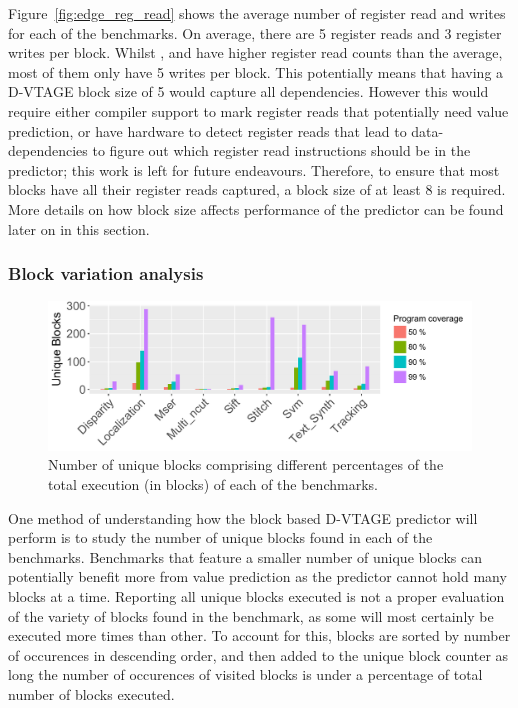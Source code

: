 Figure~\ref{fig:edge_reg_read} shows the average number of register read and writes for each of the benchmarks.
On average, there are 5 register reads and 3 register writes per block.
Whilst  ,  and  have higher register read counts than the average, most of them only have 5 writes per block.
This potentially means that having a D-VTAGE block size of 5 would capture all dependencies.
However this would require either compiler support to mark register reads that potentially need value prediction, or have hardware to detect register reads that lead to data-dependencies to figure out which register read instructions should be in the predictor; this work is left for future endeavours.
Therefore, to ensure that most blocks have all their register reads captured, a block size of at least 8 is required.
More details on how block size affects performance of the predictor can be found later on in this section.

\subsubsection{Block variation analysis}

\begin{figure}[t]
    \centering
    \includegraphics[width=1\textwidth]{chapter3/graphics/unique_blocks.pdf}

    \caption{Number of unique blocks comprising different percentages of the total execution (in blocks) of each of the benchmarks.}
    \label{fig:totblock}
	\vspace{1em}
\end{figure}

One method of understanding how the block based D-VTAGE predictor will perform is to study the number of unique blocks found in each of the benchmarks.
Benchmarks that feature a smaller number of unique blocks can potentially benefit more from value prediction as the predictor cannot hold many blocks at a time.
Reporting all unique blocks executed is not a proper evaluation of the variety of blocks found in the benchmark, as some will most certainly be executed more times than other.
To account for this, blocks are sorted by number of occurences in descending order, and then added to the unique block counter as long the number of occurences of visited blocks is under a percentage of total number of blocks executed.

